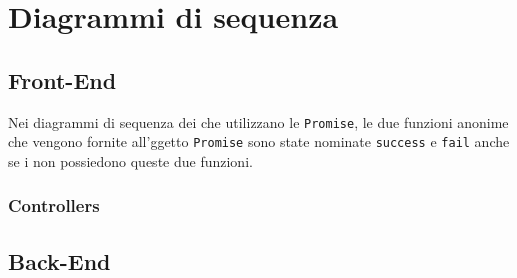 \section{Diagrammi di sequenza}
\subsection{Front-End}
Nei diagrammi di sequenza dei  che utilizzano le \texttt{Promise}, le due funzioni anonime che vengono fornite all'ggetto \texttt{Promise} sono state nominate \texttt{success} e \texttt{fail} anche se i  non possiedono queste due funzioni.
\subsubsection{Controllers}

%
\subsection{Back-End}\label{baed}

